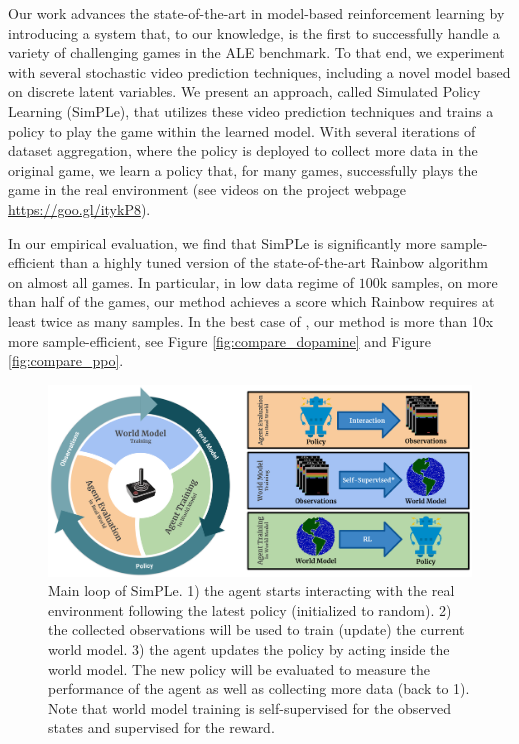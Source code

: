Our work advances the state-of-the-art in model-based reinforcement learning by introducing a system that, to our knowledge, is the first to successfully handle a variety of challenging games in the ALE benchmark. To that end, we experiment with several stochastic video prediction techniques, including a novel model based on discrete latent variables. We present an approach, called Simulated Policy Learning (SimPLe), that utilizes these video prediction techniques and trains a policy to play the game within the learned model. With several iterations of dataset aggregation, where the policy is deployed to collect more data in the original game, we learn a policy that, for many games, successfully plays the game in the real environment (see videos on the project webpage \url{https://goo.gl/itykP8}). %

In our empirical evaluation, we find that SimPLe is significantly more sample-efficient than a highly tuned version of the state-of-the-art Rainbow algorithm~\cite{rainbow} on almost all games. In particular, in low data regime of $100$k samples, on more than half of the games, our method achieves a score which Rainbow requires at least twice as many samples. In the best case of {\freeway}, our method is more than 10x more sample-efficient, see Figure \ref{fig:compare_dopamine} and Figure \ref{fig:compare_ppo}.

\begin{figure}[t]
\centering
\includegraphics[width=1.0\textwidth]{figures/Cycle_full.pdf}
\caption{Main loop of SimPLe. 1) the agent starts interacting with the real environment following the latest policy (initialized to random). 2) the collected observations will be used to train (update) the current world model. 3) the agent updates the policy by acting inside the world model. The new policy will be evaluated to measure the performance of the agent as well as collecting more data (back to 1).  Note that world model training is self-supervised for the observed states and supervised for the reward.}
\label{fig:main_cycle}
\end{figure}
